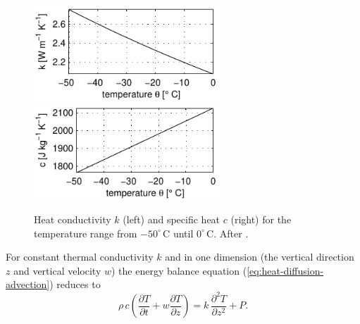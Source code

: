 \documentclass[parskip=half]{scrartcl}
\newcommand{\cels}[1]{\ensuremath{#1^{\circ}\,\mathrm{C}}}
\newcommand{\ddz}[1]{\ensuremath{\frac{\partial #1}{\partial z}}}
\newcommand{\ddt}[1]{\ensuremath{\frac{\partial #1}{\partial t}}}
\begin{document}
\begin{figure}
  \centering
   \includegraphics[width=7cm]{figures/k} \hfill
   \includegraphics[width=7cm]{figures/c}
   \caption{Heat conductivity $k$ (left) and specific heat $c$ (right) for the temperature range from \cels{-50} until \cels{0}. After \cite{Ritz1987}.}
\end{figure}
%
For constant thermal conductivity $k$ and in one dimension (the vertical
direction $z$ and vertical velocity $w$) the energy balance equation
(\ref{eq:heat-diffusion-advection}) reduces to 
%
\begin{equation}
 \label{eq:heat-diffusion-advection-1d}
 \rho\, c \left(\ddt{T} + w \ddz{T}\right) =
 k\, \frac{\partial^2T}{\partial z^2} + P.
\end{equation}
\end{document}
